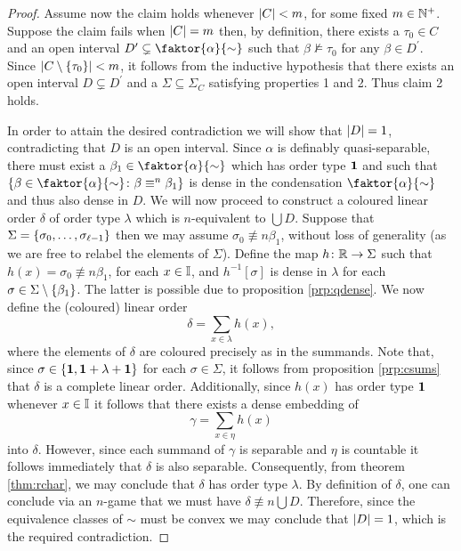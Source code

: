 \begin{proof}
	Assume now the claim holds whenever $\left\lvert C\right\rvert<m$, for some fixed $m\in\mathbb{N}^{+}$.  Suppose the claim fails when $\left\lvert C\right\rvert=m$ then, by definition, there exists a $\tau_0\in C$ and an open interval $D^\prime\subsetneq\faktor{\alpha}{\sim}$ such that $\beta\not\models\tau_0$ for any $\beta\in D^\prime$.  Since $\left\lvert C\setminus\left\lbrace \tau_0\right\rbrace\right\rvert<m$, it follows from the inductive hypothesis that there exists an open interval $D\subsetneq D^\prime$ and a $\Sigma\subseteq\Sigma_C$ satisfying properties 1 and 2.   Thus claim 2 holds.

	\smallskip	In order to attain the desired contradiction we will show that $\left\lvert D\right\rvert=1$, contradicting that $D$ is an open interval.  Since $\alpha$ is definably quasi-separable, there must exist a $\beta_1\in\faktor{\alpha}{\sim}$ which has order type $\mathbf{1}$ and such that $\setbuild{\beta\in\faktor{\alpha}{\sim}}{\beta\nequiv{n}\beta_1}$ is dense in the condensation $\faktor{\alpha}{\sim}$ and thus also dense in $D$.  We will now proceed to construct a coloured linear order $\delta$ of order type $\lambda$ which is $n$-equivalent to $\bigcup D$.  Suppose that $\Sigma=\left\lbrace \sigma_0,\dotsc,\sigma_{\ell-1}\right\rbrace$ then we may assume $\sigma_0\nequiv{n}\beta_1$, without loss of generality (as we are free to relabel the elements of $\Sigma$).  Define the map $h\colon\mathbb{R}\to\Sigma$ such that $h(x)=\sigma_0\nequiv{n}\beta_1$, for each $x\in\mathbb{I}$, and $h^{-1}[\sigma]$ is dense in $\lambda$ for each $\sigma\in\Sigma\setminus\left\lbrace \beta_1\right\rbrace$.  The latter is possible due to proposition \ref{prp:qdense}.  We now define the (coloured) linear order
	\begin{equation}
		\delta=\sum_{x\in\lambda}h(x),
	\end{equation}
	where the elements of $\delta$ are coloured precisely as in the summands.  Note that, since $\sigma\in\left\lbrace \mathbf{1},\mathbf{1}+\lambda+\mathbf{1}\right\rbrace$ for each $\sigma\in\Sigma$, it follows from proposition \ref{prp:csums} that $\delta$ is a complete linear order.  Additionally, since $h(x)$ has order type $\mathbf{1}$ whenever $x\in\mathbb{I}$ it follows that there exists a dense embedding of
	\begin{equation}
		\gamma=\sum_{x\in\eta}h(x)
	\end{equation}
	into $\delta$.  However, since each summand of $\gamma$ is separable and $\eta$ is countable it follows immediately that $\delta$ is also separable.  Consequently, from theorem \ref{thm:rchar}, we may conclude that $\delta$ has order type $\lambda$.  By definition of $\delta$, one can conclude via an $n$-game that we must have $\delta\nequiv{n}\bigcup D$.  Therefore, since the equivalence classes of $\sim$ must be convex we may conclude that $\left\lvert D\right\rvert=1$, which is the required contradiction.
\end{proof}

